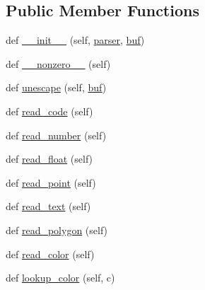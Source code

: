 \subsection*{Public Member Functions}
\begin{DoxyCompactItemize}
\item 
def \hyperlink{classsmacc__viewer_1_1xdot_1_1xdot__qt_1_1XDotAttrParser_ab8b590ee2b4d4fad9fae33e7ab32d024}{\+\_\+\+\_\+init\+\_\+\+\_\+} (self, \hyperlink{classsmacc__viewer_1_1xdot_1_1xdot__qt_1_1XDotAttrParser_adae483fba6cbbd26cb934a55271cd8d2}{parser}, \hyperlink{classsmacc__viewer_1_1xdot_1_1xdot__qt_1_1XDotAttrParser_ab491273f15a6ba35e03a8e098ea01076}{buf})
\item 
def \hyperlink{classsmacc__viewer_1_1xdot_1_1xdot__qt_1_1XDotAttrParser_a53ec56bc8c8dcad211587d6c32f57d54}{\+\_\+\+\_\+nonzero\+\_\+\+\_\+} (self)
\item 
def \hyperlink{classsmacc__viewer_1_1xdot_1_1xdot__qt_1_1XDotAttrParser_aa7732444d1ec91f2f68d68f210161685}{unescape} (self, \hyperlink{classsmacc__viewer_1_1xdot_1_1xdot__qt_1_1XDotAttrParser_ab491273f15a6ba35e03a8e098ea01076}{buf})
\item 
def \hyperlink{classsmacc__viewer_1_1xdot_1_1xdot__qt_1_1XDotAttrParser_ac919c71f5e22d2724859560509294979}{read\+\_\+code} (self)
\item 
def \hyperlink{classsmacc__viewer_1_1xdot_1_1xdot__qt_1_1XDotAttrParser_a6f88d7537e1f84df6d11f72177c75d21}{read\+\_\+number} (self)
\item 
def \hyperlink{classsmacc__viewer_1_1xdot_1_1xdot__qt_1_1XDotAttrParser_aba1fa75b27c4d10cf3c5de1eeee805bb}{read\+\_\+float} (self)
\item 
def \hyperlink{classsmacc__viewer_1_1xdot_1_1xdot__qt_1_1XDotAttrParser_acc95bb01468e72410ffbb714300dc9cc}{read\+\_\+point} (self)
\item 
def \hyperlink{classsmacc__viewer_1_1xdot_1_1xdot__qt_1_1XDotAttrParser_a5062632d89dfb47344b1f3eb6e4b8f16}{read\+\_\+text} (self)
\item 
def \hyperlink{classsmacc__viewer_1_1xdot_1_1xdot__qt_1_1XDotAttrParser_a791fe5624f47d6b459183ee32b5666a0}{read\+\_\+polygon} (self)
\item 
def \hyperlink{classsmacc__viewer_1_1xdot_1_1xdot__qt_1_1XDotAttrParser_a31b1a8bf05a07b07eab31bb3ebfbdc70}{read\+\_\+color} (self)
\item 
def \hyperlink{classsmacc__viewer_1_1xdot_1_1xdot__qt_1_1XDotAttrParser_a04448dad2bc1c0e2a8dbbc7d4137c28f}{lookup\+\_\+color} (self, c)
\item 

\end{DoxyCompactItemize}
